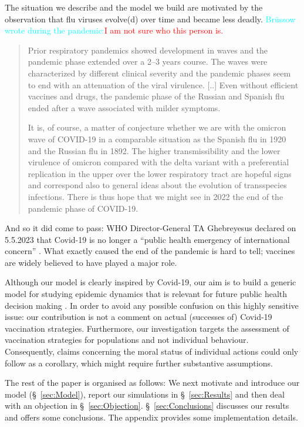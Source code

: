 \documentclass[a4paper,12pt]{article}
\newcommand{\juergen}[1]{\textcolor{cyan}{#1}}
\newcommand{\ignacio}[1]{\textcolor{red}{#1}}
\begin{document}
The situation we describe and the model we build are motivated by the observation that flu viruses evolve(d) over time and became less deadly. \juergen{Br\"ussow wrote during the pandemic:}\ignacio{I am not sure who this person is.}
\begin{quote}
Prior respiratory pandemics showed development in waves and the pandemic phase extended over a 2–3 years course. The waves were characterized by different clinical severity and the pandemic phases seem to end with an attenuation of the viral virulence. [..] Even without efficient vaccines and drugs, the pandemic phase of the Russian and Spanish flu ended after a wave associated with milder symptoms.

It is, of course, a matter of conjecture whether we are with the omicron wave of COVID-19 in a comparable situation as the Spanish flu in 1920 and the Russian flu in 1892. The higher transmissibility and the lower virulence of omicron compared with the delta variant with a preferential replication in the upper over the lower respiratory tract are hopeful signs and correspond also to general ideas about the evolution of transspecies infections. There is thus hope that we might see in 2022 the end of the pandemic phase of COVID-19. \cite[P.\ 1314]{Bruessow2022} 
\end{quote}
And so it did come to pass: WHO Director-General TA Ghebreyesus declared on 5.5.2023 that Covid-19 is no longer a ``public health emergency of international concern'' \cite{WHO2023}. What exactly caused the end of the pandemic is hard to tell; vaccines are widely believed to have played a major role.

Although our model is clearly inspired by Covid-19, our aim is to build a generic model for studying epidemic dynamics that is relevant for future public health decision making \cite{Casadevall2024}. In order to avoid any possible confusion on this highly sensitive issue: our contribution is not a comment on actual (successes of) Covid-19 vaccination strategies. Furthermore, our investigation targets the assessment of vaccination strategies for populations and not individual behaviour. Consequently, claims concerning the moral status of individual actions could only follow as a corollary, which might require further substantive assumptions.

The rest of the paper is organised as follows: We next motivate and introduce our model (\S~\ref{sec:Model}), report our simulations in \S~\ref{sec:Results} and then deal with an objection in \S~\ref{sec:Objection}. \S~\ref{sec:Conclusions} discusses our results and offers some conclusions. The appendix provides some implementation details.
\end{document}
